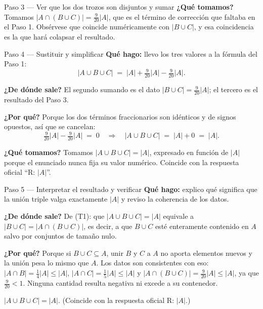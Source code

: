 \documentclass[11pt]{article}
\begin{document}
\begin{sol}
\begin{paso}{Paso 3 --- Ver que los dos trozos son disjuntos y sumar}
\textbf{¿Qué tomamos?} Tomamos $|A\cap(B\cup C)| = \tfrac{9}{20}|A|$, que es el término de corrección que faltaba en el Paso 1. Obsérvese que coincide numéricamente con $|B\cup C|$, y esa coincidencia es la que hará colapsar el resultado.
\end{paso}

\begin{paso}{Paso 4 --- Sustituir y simplificar}
\textbf{Qué hago:} llevo los tres valores a la fórmula del Paso 1:
\[
|A\cup B\cup C| \;=\; |A| + \tfrac{9}{20}|A| - \tfrac{9}{20}|A| .
\]

\textbf{¿De dónde sale?} El segundo sumando es el dato $|B\cup C| = \tfrac{9}{20}|A|$; el tercero es el resultado del Paso 3.

\textbf{¿Por qué?} Porque los dos términos fraccionarios son idénticos y de signos opuestos, así que se cancelan:
\[
\tfrac{9}{20}|A| - \tfrac{9}{20}|A| \;=\; 0
\quad\Longrightarrow\quad
|A\cup B\cup C| \;=\; |A| + 0 \;=\; |A| .
\]

\textbf{¿Qué tomamos?} Tomamos $|A\cup B\cup C| = |A|$, expresado en función de $|A|$ porque el enunciado nunca fija su valor numérico. Coincide con la respuesta oficial ``R: $|A|$''.
\end{paso}

\begin{paso}{Paso 5 --- Interpretar el resultado y verificar}
\textbf{Qué hago:} explico qué significa que la unión triple valga exactamente $|A|$ y reviso la coherencia de los datos.

\textbf{¿De dónde sale?} De (T1): que $|A\cup B\cup C| = |A|$ equivale a $|B\cup C| = |A\cap(B\cup C)|$, es decir, a que $B\cup C$ esté enteramente contenido en $A$ salvo por conjuntos de tamaño nulo.

\textbf{¿Por qué?} Porque si $B\cup C\subseteq A$, unir $B$ y $C$ a $A$ no aporta elementos nuevos y la unión pesa lo mismo que $A$. Los datos son consistentes con eso: $|A\cap B| = \tfrac14|A| \le |A|$, $|A\cap C| = \tfrac15|A| \le |A|$ y $|A\cap (B\cup C)| = \tfrac{9}{20}|A| \le |A|$, ya que $\tfrac{9}{20} < 1$. Ninguna cantidad resulta negativa ni excede a su contenedor.
\end{paso}

\end{sol}

\begin{resp}
$|A\cup B\cup C| = |A|$. \quad (Coincide con la respuesta oficial R: $|A|$.)
\end{resp}
\end{document}
